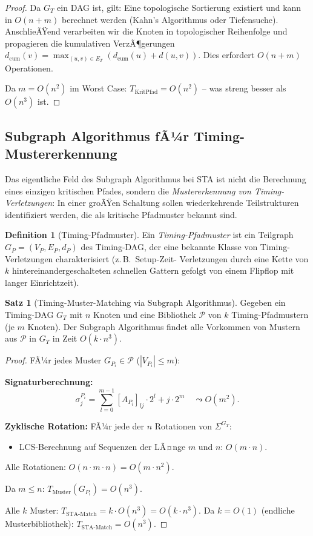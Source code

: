﻿\documentclass[a4paper,12pt]{article}
\theoremstyle{definition}
\newtheorem{definition}{Definition}
\newtheorem{satz}{Satz}
\begin{document}
\begin{proof}
  Da $G_T$ ein DAG ist, gilt: Eine topologische Sortierung existiert und kann in $O(n + m)$
  berechnet werden (Kahn's Algorithmus oder Tiefensuche). AnschlieÃŸend verarbeiten wir
  die Knoten in topologischer Reihenfolge und propagieren die kumulativen VerzÃ¶gerungen
  $d_{\text{cum}}(v) = \max_{(u,v) \in E_T} (d_{\text{cum}}(u) + d(u,v))$.
  Dies erfordert $O(n + m)$ Operationen.

  Da $m = O(n^2)$ im Worst Case: $T_{\text{KritPfad}} = O(n^2)$ -- was streng besser als
  $O(n^3)$ ist.
\end{proof}

\subsection{Subgraph Algorithmus fÃ¼r Timing-Mustererkennung}

Das eigentliche Feld des Subgraph Algorithmus bei STA ist nicht die Berechnung eines
einzigen kritischen Pfades, sondern die \emph{Mustererkennung von Timing-Verletzungen}:
In einer groÃŸen Schaltung sollen wiederkehrende Teilstrukturen identifiziert werden,
die als kritische Pfadmuster bekannt sind.

\begin{definition}[Timing-Pfadmuster]\label{def:tpm}
  Ein \emph{Timing-Pfadmuster} ist ein Teilgraph $G_P = (V_P, E_P, d_P)$ des Timing-DAG,
  der eine bekannte Klasse von Timing-Verletzungen charakterisiert (z.\,B.\ Setup-Zeit-
  Verletzungen durch eine Kette von $k$ hintereinandergeschalteten schnellen Gattern
  gefolgt von einem Flipflop mit langer Einrichtzeit).
\end{definition}

\begin{satz}[Timing-Muster-Matching via Subgraph Algorithmus]\label{satz:timing_match}
  Gegeben ein Timing-DAG $G_T$ mit $n$ Knoten und eine Bibliothek $\mathcal{P}$
  von $k$ Timing-Pfadmustern (je $m$ Knoten). Der Subgraph Algorithmus findet alle
  Vorkommen von Mustern aus $\mathcal{P}$ in $G_T$ in Zeit $O(k \cdot n^3)$.
\end{satz}

\begin{proof}
  FÃ¼r jedes Muster $G_{P_i} \in \mathcal{P}$ ($|V_{P_i}| \leq m$):

  \textbf{Signaturberechnung:}
  \[
    \sigma_j^{P_i} = \sum_{l=0}^{m-1} [A_{P_i}]_{lj} \cdot 2^l + j \cdot 2^m
    \quad \leadsto O(m^2).
  \]

  \textbf{Zyklische Rotation:} FÃ¼r jede der $n$ Rotationen von $\Sigma^{G_T}$:
  \begin{itemize}
    \item LCS-Berechnung auf Sequenzen der LÃ¤nge $m$ und $n$: $O(m \cdot n)$.
  \end{itemize}
  Alle Rotationen: $O(n \cdot m \cdot n) = O(m \cdot n^2)$.

  Da $m \leq n$: $T_{\text{Muster}}(G_{P_i}) = O(n^3)$.

  Alle $k$ Muster: $T_{\text{STA-Match}} = k \cdot O(n^3) = O(k \cdot n^3)$.
  Da $k = O(1)$ (endliche Musterbibliothek): $T_{\text{STA-Match}} = O(n^3)$.
\end{proof}
\end{document}
